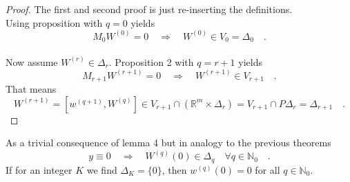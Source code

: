 \begin{proof}
	The first and second proof is just re-inserting the definitions.\\
	Using proposition with $q=0$ yields
	\begin{equation}
	M_0 W^{(0)} = 0 \quad \Rightarrow \quad W^{(0)} \in V_0 = \Delta_0 \quad . 
	\end{equation}\\
	Now assume $W^{(r)}\in\Delta_r$. Proposition 2 with $q=r+1$ yields
	\begin{equation}
	M_{r+1} W^{(r+1)} = 0 \quad \Rightarrow \quad W^{(r+1)} \in V_{r+1} \quad .
	\end{equation}
	That means 
	\begin{equation}	
	W^{(r+1)}=\left[w^{(q+1)},W^{(q)}\right] 
	\in V_{r+1} \cap (\mathbb{R}^m \times \Delta_r)
	= V_{r+1} \cap P\Delta_r = \Delta_{r+1} \quad .
	\end{equation}
\end{proof}
\begin{theorem}{}{}
	As a trivial consequence of lemma 4 but in analogy to the previous theorems
	\begin{equation}
	y\equiv 0 \quad \Rightarrow\quad W^{(q)}(0) \in \Delta_q \quad \forall q\in\mathbb{N}_0
	\quad .
	\end{equation}
	If for an integer $K$ we find $\Delta_K=\{0\}$, then $w^{(q)}(0)=0$ for all $q
	\in\mathbb{N}_0$. 
\end{theorem}
